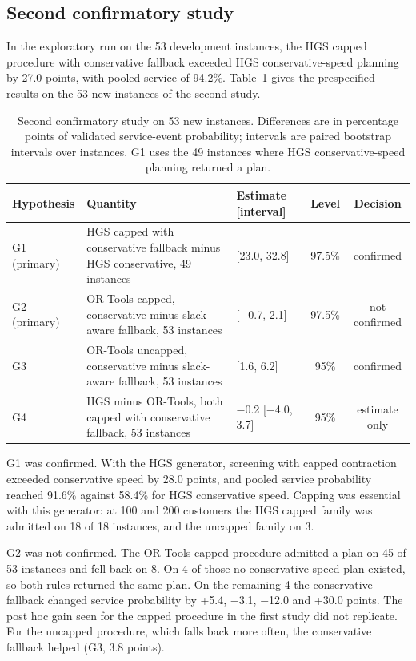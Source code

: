 \subsection{Second confirmatory study}\label{sec:confirmatory2}

In the exploratory run on the 53 development instances, the HGS capped procedure with conservative fallback exceeded HGS conservative-speed planning by 27.0 points, with pooled service of 94.2\%. Table~\ref{tab:confirmatory2} gives the prespecified results on the 53 new instances of the second study.

\begin{table}[htbp]
\centering
\footnotesize
\caption{Second confirmatory study on 53 new instances. Differences are in percentage points of validated service-event probability; intervals are paired bootstrap intervals over instances. G1 uses the 49 instances where HGS conservative-speed planning returned a plan.}
\label{tab:confirmatory2}
\begin{tabular}{@{}>{\raggedright\arraybackslash}p{1.9cm}>{\raggedright\arraybackslash}p{4.4cm}>{\raggedright\arraybackslash}p{3.3cm}cc@{}}
\toprule
Hypothesis & Quantity & Estimate [interval] & Level & Decision\\
\midrule
G1 (primary) & HGS capped with conservative fallback minus HGS conservative, 49 instances & 28.0 [23.0, 32.8] & 97.5\% & confirmed\\
G2 (primary) & OR-Tools capped, conservative minus slack-aware fallback, 53 instances & 0.4 [$-$0.7, 2.1] & 97.5\% & not confirmed\\
G3 & OR-Tools uncapped, conservative minus slack-aware fallback, 53 instances & 3.8 [1.6, 6.2] & 95\% & confirmed\\
G4 & HGS minus OR-Tools, both capped with conservative fallback, 53 instances & $-$0.2 [$-$4.0, 3.7] & 95\% & estimate only\\
\bottomrule
\end{tabular}
\end{table}

G1 was confirmed. With the HGS generator, screening with capped contraction exceeded conservative speed by 28.0 points, and pooled service probability reached 91.6\% against 58.4\% for HGS conservative speed. Capping was essential with this generator: at 100 and 200 customers the HGS capped family was admitted on 18 of 18 instances, and the uncapped family on 3.

G2 was not confirmed. The OR-Tools capped procedure admitted a plan on 45 of 53 instances and fell back on 8. On 4 of those no conservative-speed plan existed, so both rules returned the same plan. On the remaining 4 the conservative fallback changed service probability by +5.4, $-$3.1, $-$12.0 and +30.0 points. The post hoc gain seen for the capped procedure in the first study did not replicate. For the uncapped procedure, which falls back more often, the conservative fallback helped (G3, 3.8 points).

